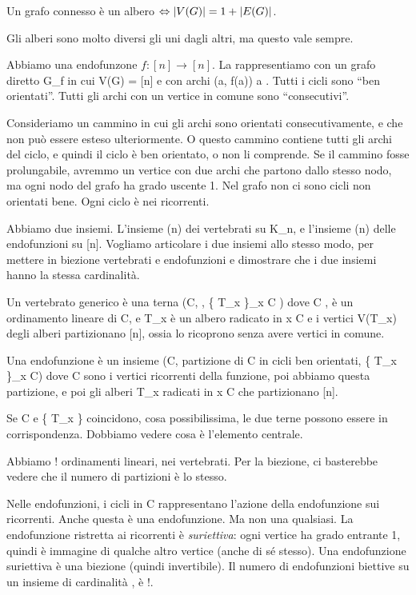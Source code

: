 \begin{prop}
	Un grafo connesso \`e un albero $\Leftrightarrow \left\lvert{V(G)}\right\rvert = 1 + \left\lvert{E(G)}\right\rvert$.
\end{prop}
Gli alberi sono molto diversi gli uni dagli altri, ma questo vale sempre.




Abbiamo una endofunzone $f : [n] \to [n]$.
La rappresentiamo con un grafo diretto G_f in cui V(G) = [n] e con archi (a, f(a)) \forall a \in [n].
Tutti i cicli sono ``ben orientati''.
Tutti gli archi con un vertice in comune sono ``consecutivi''.

Consideriamo un cammino in cui gli archi sono orientati consecutivamente, e che non pu\`o essere esteso ulteriormente.
O questo cammino contiene tutti gli archi del ciclo, e quindi il ciclo \`e ben orientato, o non li comprende.
Se il cammino fosse prolungabile, avremmo un vertice con due archi che partono dallo stesso nodo, ma ogni nodo del grafo ha grado uscente 1.
Nel grafo non ci sono cicli non orientati bene.
Ogni ciclo \`e nei ricorrenti.

Abbiamo due insiemi.
L'insieme (n) dei vertebrati su K_n, e l'insieme (n) delle endofunzioni su [n].
Vogliamo articolare i due insiemi allo stesso modo, per mettere in biezione vertebrati e endofunzioni e dimostrare che i due insiemi hanno
la stessa cardinalit\`a.

Un vertebrato generico \`e una terna (C, , \{ T_x \}_{x \in C} ) dove C \subseteq [n],  \`e un ordinamento lineare di C, e T_x \`e un albero radicato in x \in C e i vertici V(T_x) degli alberi partizionano [n], ossia lo ricoprono senza avere vertici in comune.

Una endofunzione \`e un insieme (C, partizione di C in cicli ben orientati, \{ T_x \}_{x \in C}) dove C \subseteq [n] sono i vertici ricorrenti della funzione, poi abbiamo questa partizione, e poi gli alberi T_x radicati in x \in C che partizionano [n].

Se C e \{ T_x \} coincidono, cosa possibilissima, le due terne possono essere in corrispondenza.
Dobbiamo vedere cosa \`e l'elemento centrale.

Abbiamo ! ordinamenti lineari, nei vertebrati.
Per la biezione, ci basterebbe vedere che il numero di partizioni \`e lo stesso.

Nelle endofunzioni, i cicli in C rappresentano l'azione della endofunzione sui ricorrenti.
Anche questa \`e una endofunzione.
Ma non una qualsiasi.
La endofunzione ristretta ai ricorrenti \`e \emph{suriettiva}: ogni vertice ha grado entrante 1, quindi \`e immagine di qualche altro vertice (anche di s\'e stesso).
Una endofunzione suriettiva \`e una biezione (quindi invertibile).
Il numero di endofunzioni biettive su un insieme di cardinalit\`a , \`e !.

